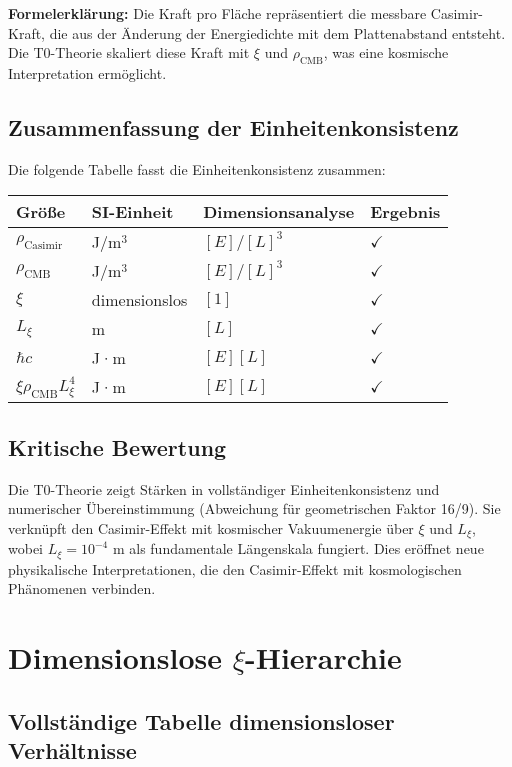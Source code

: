 \documentclass[12pt,a4paper]{article}
\theoremstyle{definition}
\theoremstyle{remark}
\begin{document}
	\textbf{Formelerkl\"arung:} Die Kraft pro Fl\"ache repr\"asentiert die messbare Casimir-Kraft, die aus der \"Anderung der Energiedichte mit dem Plattenabstand entsteht. Die T0-Theorie skaliert diese Kraft mit $\xi$ und $\rho_{\text{CMB}}$, was eine kosmische Interpretation erm\"oglicht.
	
	\subsection{Zusammenfassung der Einheitenkonsistenz}
	Die folgende Tabelle fasst die Einheitenkonsistenz zusammen:
	\begin{table}[h]
		\centering
		\begin{tabular}{l l l l}
			\toprule
			Gr\"o\ss{}e & SI-Einheit & Dimensionsanalyse & Ergebnis \\
			\midrule
			$\rho_{\text{Casimir}}$ & J/m$^3$ & $[E]/[L]^3$ & $\checkmark$ \\
			$\rho_{\text{CMB}}$ & J/m$^3$ & $[E]/[L]^3$ & $\checkmark$ \\
			$\xi$ & dimensionslos & $[1]$ & $\checkmark$ \\
			$L_\xi$ & m & $[L]$ & $\checkmark$ \\
			$\hbar c$ & J·m & $[E][L]$ & $\checkmark$ \\
			$\xi \rho_{\text{CMB}} L_\xi^4$ & J·m & $[E][L]$ & $\checkmark$ \\
			\bottomrule
		\end{tabular}
	\end{table}
	
	\subsection{Kritische Bewertung}
	Die T0-Theorie zeigt St\"arken in vollst\"andiger Einheitenkonsistenz und numerischer \"Ubereinstimmung (Abweichung f\"ur geometrischen Faktor 16/9). Sie verkn\"upft den Casimir-Effekt mit kosmischer Vakuumenergie \"uber $\xi$ und $L_\xi$, wobei $L_\xi = 10^{-4}$ m als fundamentale L\"angenskala fungiert. Dies er\"offnet neue physikalische Interpretationen, die den Casimir-Effekt mit kosmologischen Ph\"anomenen verbinden.
	
	\section{Dimensionslose $\xi$-Hierarchie}
	
	\subsection{Vollst\"andige Tabelle dimensionsloser Verh\"altnisse}
	
\end{document}
